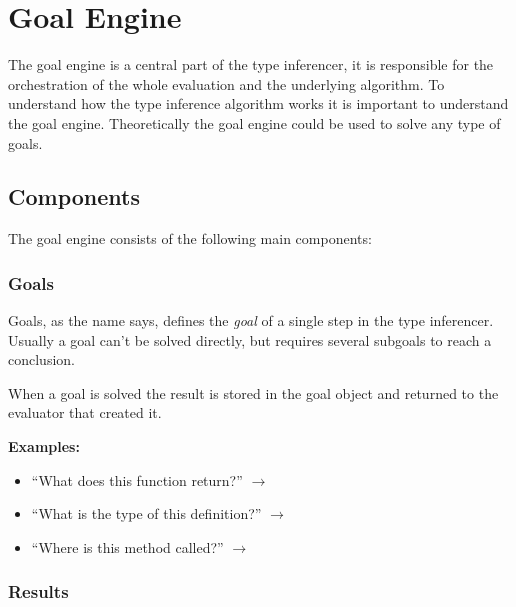 \documentclass[12pt,halfparskip,DIV11,BCOR10mm]{scrreprt}
\begin{document}
\section{Goal Engine}


The goal engine is a central part of the type inferencer, it is responsible for the orchestration of the whole evaluation and the underlying algorithm. To understand how the type inference algorithm works it is important to understand the goal engine. Theoretically the goal engine could be used to solve any type of goals.

\subsection{Components}

The goal engine consists of the following main components:

\subsubsection{Goals}

Goals, as the name says, defines the \emph{goal} of a single step in the type inferencer. Usually a goal can't be solved directly, but requires several subgoals to reach a conclusion.

When a goal is solved the result is stored in the goal object and returned to the evaluator that created it.

\textbf{Examples:}

\begin{itemize}
    \item ``What does this function return?''  $\rightarrow$  
    \item ``What is the type of this definition?'' $\rightarrow$ 
    \item ``Where is this method called?'' $\rightarrow$ 
\end{itemize}

\subsubsection{Results}

\end{document}
